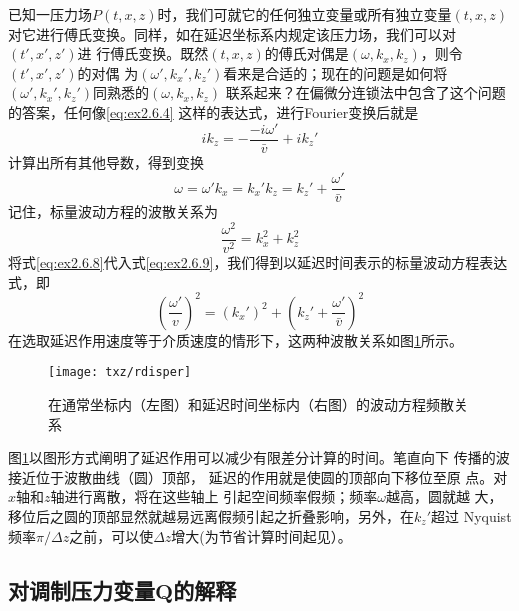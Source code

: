 已知一压力场$P(t,x,z)$时，我们可就它的任何独立变量或所有独立变量$(t,x,z)$
对它进行傅氏变换。同样，如在延迟坐标系内规定该压力场，我们可以对$(t',x',z')$进
行傅氏变换。既然$(t,x,z)$的傅氏对偶是$(\omega,k_x,k_z)$，则令$(t',x',z')$的对偶
为$(\omega',k_x',k_z')$看来是合适的；现在的问题是如何将$(\omega',k_x',k_z')$同熟悉的$(\omega,k_x,k_z)$
联系起来？在偏微分连锁法中包含了这个问题的答案，任何像\ref{eq:ex2.6.4}
这样的表达式，进行Fourier变换后就是
\begin{equation}
ik_z=-\frac{-i\omega'}{\bar{v}}+ik_z'
\label{eq:ex2.6.7}
\end{equation}
计算出所有其他导数，得到变换
\begin{subequations}
\begin{equation}
\omega = \omega '
\label{eq:ex2.6.8a}
\end{equation}
\begin{equation}
k_x=k_x'
\label{eq:ex2.6.8b}
\end{equation}
\begin{equation}
k_z=k_z'+\frac{\omega'}{\bar{v}}
\label{eq:ex2.6.8c}
\end{equation}
\label{eq:ex2.6.8}
\end{subequations}
记住，标量波动方程的波散关系为
\begin{equation}
\frac{\omega^2}{v^2}=k_x^2+k_z^2
\label{eq:ex2.6.9}
\end{equation}
将式\ref{eq:ex2.6.8}代入式\ref{eq:ex2.6.9}，我们得到以延迟时间表示的标量波动方程表达式，即
\begin{equation}
(\frac{\omega'}{v})^2=(k_x')^2+(k_z'+\frac{\omega'}{\bar{v}})^2
\label{eq:ex2.6.10}
\end{equation}
在选取延迟作用速度等于介质速度的情形下，这两种波散关系如图\ref{fig:txz/rdisper}所示。
\begin{figure}[H]
\centering
\texttt{[image: txz/rdisper]}
\caption[rdisper]{在通常坐标内（左图）和延迟时间坐标内（右图）的波动方程频散关系}
\label{fig:txz/rdisper}
\end{figure}
图\ref{fig:txz/rdisper}以图形方式阐明了延迟作用可以减少有限差分计算的时间。笔直向下
传播的波接近位于波散曲线（圆）顶部，
延迟的作用就是使圆的顶部向下移位至原
点。对$x$轴和$z$轴进行离散，将在这些轴上
引起空间频率假频；频率$\omega$越高，圆就越
大，移位后之圆的顶部显然就越易远离假频引起之折叠影响，另外，在$k_z'$超过
Nyquist频率$\pi/\Delta z$之前，可以使$\Delta z$增大(为节省计算时间起见）。

\subsection{对调制压力变量$\mathbf{Q}$的解释}
\label{sec:2.6.5}
